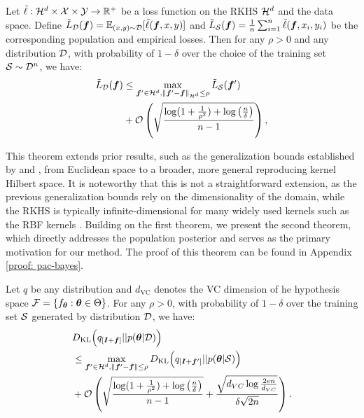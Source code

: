\begin{theorem} [Informal]
\label{theorem: flow sharpness}
Let $\Tilde{\ell}: {\mathcal{H}}^d \times {\mathcal{X}} \times {\mathcal{Y}} \to \mathbb{R}^+$ be a loss function on the RKHS ${\mathcal{H}}^d$ and the data space. Define $\Tilde{L}_{\mathcal{D}}({\bm{f}}) = \mathbb{E}_{(x, y) \sim {\mathcal{D}}}[\Tilde{\ell}({\bm{f}}, x, y)]$ and $\Tilde{L}_{\mathcal{S}}({\bm{f}}) = \frac{1}{n}\sum_{i=1}^n\Tilde{\ell}({\bm{f}}, x_i, y_i)$ be the corresponding population and empirical losses. Then for any $\rho >0$ and any distribution ${\mathcal{D}}$, with probability of $1-\delta$ over the choice of the training set ${\mathcal{S}} \sim {\mathcal{D}}^n$, we have:
\begin{align*}
     \Tilde{L}_{\mathcal{D}} ({\bm{f}}) &\leq \max_{{\bm{f}}' \in {\mathcal{H}}^d, \|{\bm{f}}' - {\bm{f}}\|_{{\mathcal{H}}^d} \leq \rho}\Tilde{L}_{\mathcal{S}}({\bm{f}}') 
     \\&+\mathcal{O}\left(\sqrt{\frac{\log(1+\frac{1}{\rho^2})+ \log\left(\frac{n}{\delta}\right)}{n-1}}\right),
\end{align*}
\end{theorem}
This theorem extends prior results, such as the generalization bounds established by \citet{sam} and \citet{fishersam}, from Euclidean space to a broader, more general reproducing kernel Hilbert space. It is noteworthy that this is not a straightforward extension, as the previous generalization bounds rely on the dimensionality of the domain, while the RKHS is typically infinite-dimensional for many widely used kernels such as the RBF kernels \citep{rkhsinfinitedim}. Building on the first theorem, we present the second theorem, which directly addresses the population posterior and serves as the primary motivation for our method. The proof of this theorem can be found in Appendix \ref{proof: pac-bayes}.
\begin{theorem}[Informal]
\label{theorem: pac-bayes}
Let $q$ be any distribution and $d_{\mathrm{VC}}$ denotes the VC dimension of he hypothesis space $\mathcal{F} = \{f_{\bm{\theta}}: {\bm{\theta}} \in \Theta\}$. For any $\rho > 0$, with probability of $1 - \delta$ over the training set ${\mathcal{S}}$ generated by distribution ${\mathcal{D}}$, we have:
    \begin{align*}
    &D_{\mathrm{KL}}\Big(q_{[{\bm{I}}+ {\bm{f}}]} || p({\bm{\theta}}|{\mathcal{D}})\Big)\\ 
    &\leq \max_{{\bm{f}}' \in {\mathcal{H}}^d, \|{\bm{f}}' - {\bm{f}}\| \leq \rho}D_{\mathrm{KL}}\Big(q_{[{\bm{I}} + {\bm{f}}']} || p({\bm{\theta}} | {\mathcal{S}})\Big) \\
    &+ \mathcal{O}\left(\sqrt{\frac{\log(1+\frac{1}{\rho^2})+ \log\left(\frac{n}{\delta}\right)}{n-1}}+ \frac{\sqrt{d_{VC}\log\frac{2en}{d_{VC}}}}{\delta\sqrt{2n}}\right).
    \end{align*}
\end{theorem}

